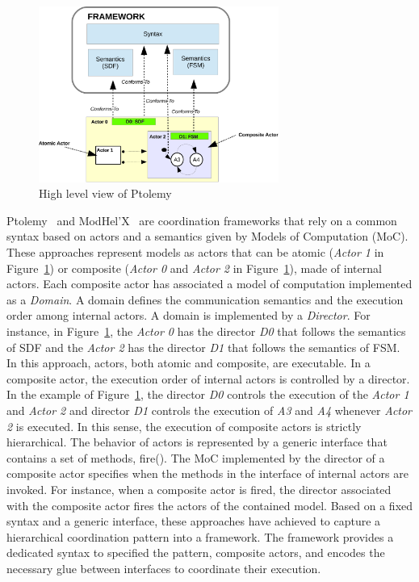 \begin{figure}
\begin{center}
\includegraphics[width=0.7\textwidth]{background/figs/ptolemyfig}
\caption{High level view of Ptolemy~\cite{giraultbib}}
         			\label{fig:ptolemyfig}
         		\end{center}
\end{figure}
         	
Ptolemy~\cite{ptoleframebib} and ModHel'X~\cite{modhelxbib} are coordination frameworks that rely on a common syntax based on actors and a semantics given by Models of Computation (MoC). These approaches represent models as actors that can be atomic (\eg \emph{Actor 1} in Figure~\ref{fig:ptolemyfig}) or composite (\eg \emph{Actor 0} and \emph{Actor 2} in Figure~\ref{fig:ptolemyfig}), \ie made of internal actors. Each composite actor has associated a model of computation implemented as a \emph{Domain}. A domain defines the communication semantics and the execution order among internal actors. A domain is implemented by a \emph{Director}. For instance, in Figure~\ref{fig:ptolemyfig}, the \emph{Actor 0} has the director \emph{D0} that follows the semantics of SDF and the \emph{Actor 2} has the director \emph{D1} that follows the semantics of FSM. In this approach, actors, both atomic and composite, are executable. In a composite actor, the execution order of internal actors is controlled by a director. In the example of Figure~\ref{fig:ptolemyfig}, the director \emph{D0} controls the execution of the \emph{Actor 1} and \emph{Actor 2} and director \emph{D1} controls the execution of \emph{A3} and \emph{A4} whenever \emph{Actor 2} is executed. In this sense, the execution of composite actors is strictly hierarchical. The behavior of actors is represented by a generic interface that contains a set of methods, \eg fire(). The MoC implemented by the director of a composite actor specifies when the methods in the interface of internal actors are invoked. For instance, when a composite actor is fired, the director associated with the composite actor fires the actors of the contained model. Based on a fixed syntax and a generic interface, these approaches have achieved to capture a hierarchical coordination pattern into a framework. The framework provides a dedicated syntax to specified the pattern, \ie composite actors, and encodes the necessary glue between interfaces to coordinate their execution. 
         	

